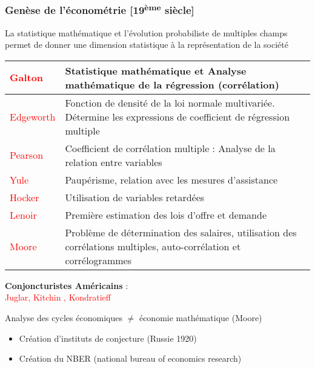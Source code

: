 \documentclass{article}
\begin{document}
\subsubsection{Genèse de l'économétrie [19\textsuperscript{ème} siècle]}
La statistique mathématique et l'évolution probabiliste de multiples champs permet de donner une dimension statistique à la représentation de la société
\begin{center}
    \begin{tabular}{m{60pt}|m{300pt}}
        \textcolor{red}{Galton} & Statistique mathématique et Analyse mathématique de la régression (corrélation)\\
        \hline
        \textcolor{red}{Edgeworth} & Fonction de densité de la loi normale multivariée. Détermine les expressions de coefficient de régression multiple \\
        \hline
        \textcolor{red}{Pearson} & Coefficient de corrélation multiple : Analyse de la relation entre variables\\
        \hline
        \textcolor{red}{Yule} & Paupérisme, relation avec les mesures d'assistance\\
        \hline
        \textcolor{red}{Hocker} & Utilisation de variables retardées\\
        \hline
        \textcolor{red}{Lenoir} & Première estimation des lois d'offre et demande\\
        \hline
        \textcolor{red}{Moore} & Problème de détermination des salaires, utilisation des corrélations multiples, auto-corrélation et corrélogrammes 
    \end{tabular}
\end{center}
\centering\textbf{Conjoncturistes Américains} : \\
\textcolor{red}{Juglar, Kitchin , Kondratieff}\\
\raggedright
Analyse des cycles économiques \(\neq\) économie mathématique (Moore)\\
\begin{itemize}
    \item Création d'instituts de conjecture (Russie 1920)
    \item Création du NBER (national bureau of economics research) 
\end{itemize}
\end{document}
